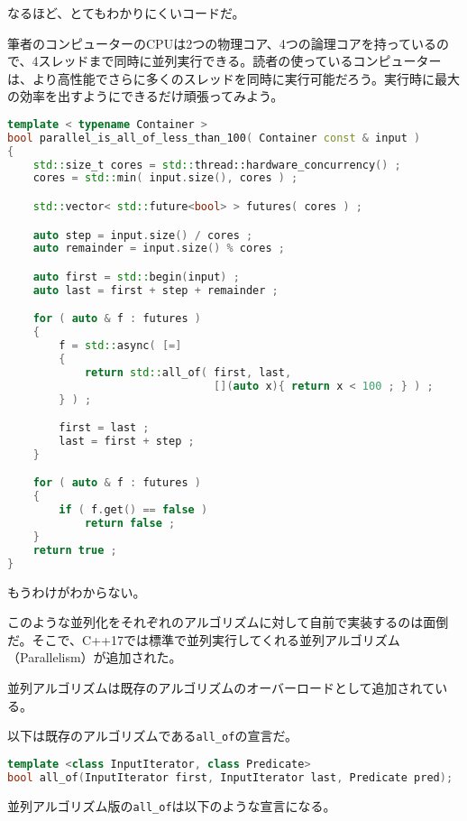 なるほど、とてもわかりにくいコードだ。

筆者のコンピューターのCPUは2つの物理コア、4つの論理コアを持っているので、4スレッドまで同時に並列実行できる。読者の使っているコンピューターは、より高性能でさらに多くのスレッドを同時に実行可能だろう。実行時に最大の効率を出すようにできるだけ頑張ってみよう。

\begin{lstlisting}[language=C++]
template < typename Container >
bool parallel_is_all_of_less_than_100( Container const & input )
{
    std::size_t cores = std::thread::hardware_concurrency() ;
    cores = std::min( input.size(), cores ) ;

    std::vector< std::future<bool> > futures( cores ) ;

    auto step = input.size() / cores ;
    auto remainder = input.size() % cores ;

    auto first = std::begin(input) ;
    auto last = first + step + remainder ;

    for ( auto & f : futures )
    {
        f = std::async( [=]
        {
            return std::all_of( first, last,
                                [](auto x){ return x < 100 ; } ) ;
        } ) ;

        first = last ;
        last = first + step ;
    }

    for ( auto & f : futures )
    {
        if ( f.get() == false )
            return false ;
    }
    return true ;
}
\end{lstlisting}

もうわけがわからない。

このような並列化をそれぞれのアルゴリズムに対して自前で実装するのは面倒だ。そこで、C++17では標準で並列実行してくれる並列アルゴリズム（Parallelism）が追加された。

%

並列アルゴリズムは既存のアルゴリズムのオーバーロードとして追加されている。

以下は既存のアルゴリズムである\lstinline!all_of!の宣言だ。

\begin{lstlisting}[language=C++]
template <class InputIterator, class Predicate>
bool all_of(InputIterator first, InputIterator last, Predicate pred);
\end{lstlisting}

並列アルゴリズム版の\lstinline!all_of!は以下のような宣言になる。

